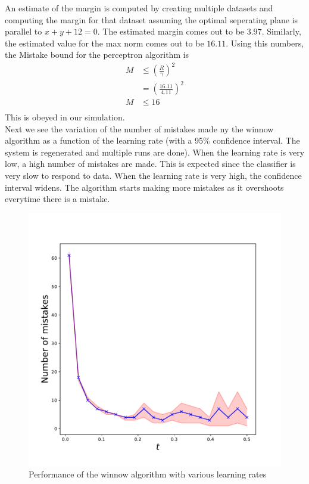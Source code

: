 \documentclass{article}
\begin{document}
An estimate of the margin is computed by creating multiple datasets and computing the margin for that dataset assuming the optimal seperating plane is parallel to $x+y+12=0$. The estimated margin comes out to be $3.97$. Similarly, the estimated value for the max norm comes out to be $16.11$. Using this numbers, the Mistake bound for the perceptron algorithm is
\begin{align*}
    M &\leq \left(\frac{R}{\gamma}\right)^2\\
    &=\left(\frac{16.11}{4.11}\right)^2\\
    M &\leq 16\\
\end{align*}
This is obeyed in our simulation.\\

Next we see the variation of the number of mistakes made ny the winnow algorithm as a function of the learning rate (with a 95\% confidence interval. The system is regenerated and multiple runs are done). When the learning rate is very low, a high number of mistakes are made. This is expected since the classifier is very slow to respond to data. When the learning rate is very high, the confidence interval widens. The algorithm starts making more mistakes as it overshoots everytime there is a mistake.
\begin{figure}[h!]
\centering
\includegraphics[scale=0.4]{q6b}
\caption{Performance of the winnow algorithm with various learning rates}
\end{figure}
\end{document}
